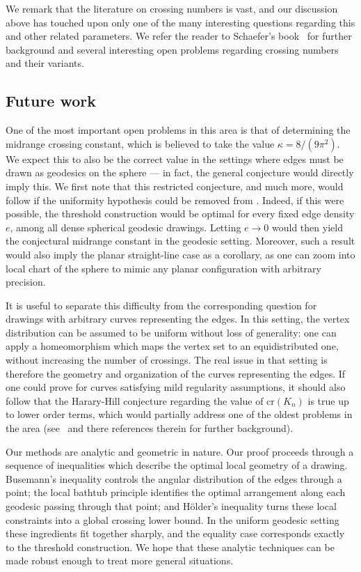 \documentclass[reqno, 11pt]{amsart}
\theoremstyle{definition}
\begin{document}
We remark that the literature on crossing numbers is vast, and our discussion above has touched upon only one of the many interesting questions regarding this and other related parameters. We refer the reader to Schaefer's book~\cite{SchaeferSurvey} for further background and several interesting open problems regarding crossing numbers and their variants.

\subsection{Future work}
One of the most important open problems in this area is that of determining the midrange crossing constant, which is believed to take the value \(\kappa = 8/(9\pi^2)\). We expect this to also be the correct value in the settings where edges must be drawn as geodesics on the sphere --- in fact, the general conjecture would directly imply this. We first note that this restricted conjecture, and much more, would follow if the uniformity hypothesis could be removed from . Indeed, if this were possible, the threshold construction would be optimal for every fixed edge density \(e\), among all dense spherical geodesic drawings. Letting \(e\to0\) would then yield the conjectural midrange constant in the geodesic setting. Moreover, such a result would also imply the planar straight-line case as a corollary, as one can zoom into local chart of the sphere to mimic any planar configuration with arbitrary precision.

It is useful to separate this difficulty from the corresponding question for drawings with arbitrary curves representing the edges. In this setting, the vertex distribution can be assumed to be uniform without loss of generality: one can apply a homeomorphism which maps the vertex set to an equidistributed one, without increasing the number of crossings. The real issue in that setting is therefore the geometry and organization of the curves representing the edges. If one could prove  for curves satisfying mild regularity assumptions, it should also follow that the Harary-Hill conjecture regarding the value of $\mathrm{cr}(K_n)$ is true up to lower order terms, which would partially address one of the oldest problems in the area (see~\cite{MR3982073} and there references therein for further background).

Our methods are analytic and geometric in nature. Our proof proceeds through a sequence of inequalities which describe the optimal local geometry of a drawing. Busemann's inequality controls the angular distribution of the edges through a point; the local bathtub principle identifies the optimal arrangement along each geodesic passing through that point; and H\"older's inequality turns these local constraints into a global crossing lower bound. In the uniform geodesic setting these ingredients fit together sharply, and the equality case corresponds exactly to the threshold construction. We hope that these analytic techniques can be made robust enough to treat more general situations.
\end{document}
